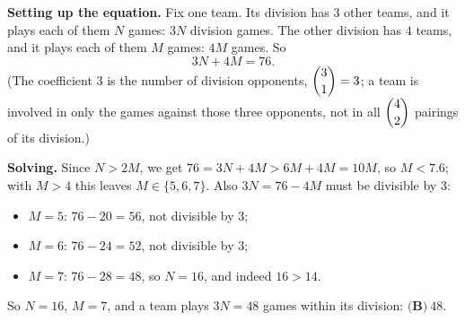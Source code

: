\textbf{Setting up the equation.} Fix one team. Its division has $3$ other teams, and it plays each of them $N$ games: $3N$ division games. The other division has $4$ teams, and it plays each of them $M$ games: $4M$ games. So
\[3N+4M=76 .\]
(The coefficient $3$ is the number of division opponents, $\dbinom31=3$; a team is involved in only the games against those three opponents, not in all $\dbinom42$ pairings of its division.)

\textbf{Solving.} Since $N>2M$, we get $76=3N+4M>6M+4M=10M$, so $M<7.6$; with $M>4$ this leaves $M\in\{5,6,7\}$. Also $3N=76-4M$ must be divisible by $3$:
\begin{itemize}
\item $M=5$: $76-20=56$, not divisible by $3$;
\item $M=6$: $76-24=52$, not divisible by $3$;
\item $M=7$: $76-28=48$, so $N=16$, and indeed $16>14$.
\end{itemize}
So $N=16$, $M=7$, and a team plays $3N=48$ games within its division: $\boxed{\textbf{(B)}\ 48}$.
